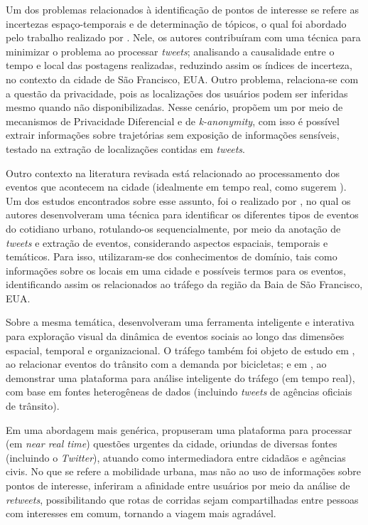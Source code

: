 \documentclass[
	12pt,				%
	oneside,			%
	a4paper,			%
	english,			%
	brazil				%
	]{abntex2ppgsi}
\begin{document}
{{Um dos problemas relacionados à identificação de pontos de interesse se refere as incertezas espaço-temporais e de determinação de tópicos, o qual foi abordado pelo trabalho realizado por \cite{Bendler2014}. Nele, os autores contribuíram com uma técnica para minimizar o problema ao processar \textit{tweets}; analisando a causalidade entre o tempo e local das postagens realizadas, reduzindo assim os índices de incerteza, no contexto da cidade de São Francisco, EUA. Outro problema, relaciona-se com a questão da privacidade, pois as localizações dos usuários podem ser inferidas mesmo quando não disponibilizadas. Nesse cenário, \cite{Wang2017} propõem um  por meio de mecanismos de Privacidade Diferencial e de \textit{k-anonymity}, com isso é possível extrair informações sobre trajetórias sem exposição de informações sensíveis, testado na extração de localizações contidas em \textit{tweets}. 

Outro contexto na literatura revisada está relacionado ao processamento dos eventos que acontecem na cidade (idealmente em tempo real, como sugerem \cite{Soomro2016}). Um dos estudos encontrados sobre esse assunto, foi o realizado por \cite{Anantharam2015}, no qual os autores desenvolveram uma técnica para identificar os diferentes tipos de eventos do cotidiano urbano, rotulando-os sequencialmente, por meio da anotação de \textit{tweets} e extração de eventos, considerando aspectos espaciais, temporais e temáticos. Para isso, utilizaram-se dos conhecimentos de domínio, tais como informações sobre os locais em uma cidade e possíveis termos para os eventos, identificando assim os relacionados ao tráfego da região da Baia de São Francisco, EUA. 

Sobre a mesma temática, \cite{DiLorenzo2013} desenvolveram uma ferramenta inteligente e interativa para exploração visual da dinâmica de eventos sociais ao longo das dimensões espacial, temporal e organizacional. O tráfego também foi objeto de estudo em \cite{Chen2016}, ao relacionar eventos do trânsito com a demanda por bicicletas; e em \cite{Lecue2014}, ao demonstrar uma plataforma para análise inteligente do tráfego (em tempo real), com base em fontes heterogêneas de dados (incluindo \textit{tweets} de agências oficiais de trânsito).

Em uma abordagem mais genérica, \cite{Mukherjee2015} propuseram uma plataforma para processar (em \textit{near real time}) questões urgentes da cidade, oriundas de diversas fontes (incluindo o \textit{Twitter}), atuando como intermediadora entre cidadãos e agências civis. No que se refere a mobilidade urbana, mas não ao uso de informações sobre pontos de interesse, \cite{Yousaf2014} inferiram a afinidade entre usuários por meio da análise de \textit{retweets}, possibilitando que rotas de corridas sejam compartilhadas entre pessoas com interesses em comum, tornando a viagem mais agradável.

}}
\end{document}
